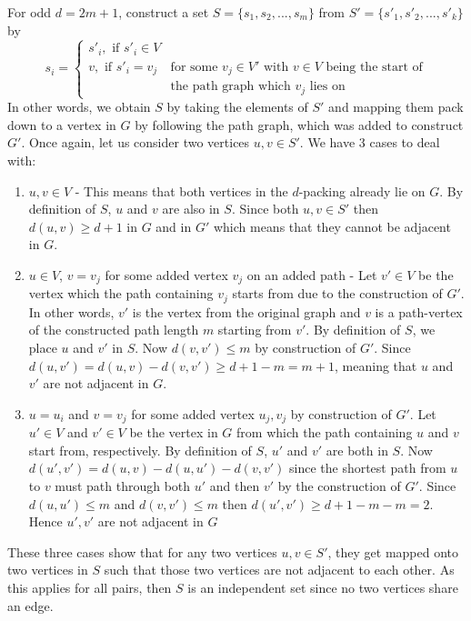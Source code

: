 \documentclass[10pt, a4paper]{article}
\theoremstyle{definition}
\newcommand{\n}{\\}
\begin{document}
For odd $d = 2m+1$, construct a set $S = \{s_1, s_2, ..., s_m\}$ from $S' = \{s'_1, s'_2, ... ,s'_k\}$ by
\[ s_i = \begin{cases}
	s'_i, \text{ if } s'_i \in V & \n
	v, \text{ if }  s'_i = v_j & \text{for some } v_j \in V' \text{ with $v \in V$ being the start of} \n & \text{the path graph which $v_j$ lies on}
\end{cases}\]
In other words, we obtain $S$ by taking the elements of $S'$ and mapping them pack down to a vertex in $G$ by following the path graph, which was added to construct $G'$. Once again, let us consider two vertices $u,v \in S'$. We have 3 cases to deal with:
\begin{enumerate}
	\item $u,v \in V$ - This means that both vertices in the $d$-packing already lie on $G$. By definition of $S$, $u$ and $v$ are also in $S$. Since both $u,v \in S'$ then $d(u,v) \geq d+1$ in $G$ and in $G'$ which means that they cannot be adjacent in $G$.
	\item $u \in V$, $v = v_j$ for some added vertex $v_j$ on an added path - Let $v' \in V$ be the vertex which the path containing $v_j$ starts from due to the construction of $G'$. In other words, $v'$ is the vertex from the original graph and $v$ is a path-vertex of the constructed path length $m$ starting from $v'$. By definition of $S$, we place $u$ and $v'$ in $S$. Now $d(v,v') \leq m$ by construction of $G'$. Since $d(u,v') = d(u,v) - d(v,v') \geq d + 1 - m = m + 1$, meaning that $u$ and $v'$ are not adjacent in $G$.
	\item $u = u_i$ and $v = v_j$ for some added vertex $u_j,v_j$ by construction of $G'$. Let $u' \in V$ and $v' \in V$ be the vertex in $G$ from which the path containing $u$ and $v$ start from, respectively. By definition of $S$, $u'$ and $v'$ are both in $S$. Now $d(u',v') = d(u,v) - d(u,u') - d(v,v')$ since the shortest path from $u$ to $v$ must path through both $u'$ and then $v'$ by the construction of $G'$. Since $d(u,u') \leq m$ and $d(v,v') \leq m$ then $d(u',v') \geq d + 1 - m - m = 2$. Hence $u', v'$ are not adjacent in $G$
\end{enumerate}
These three cases show that for any two vertices $u,v \in S'$, they get mapped onto two vertices in $S$ such that those two vertices are not adjacent to each other. As this applies for all pairs, then $S$ is an independent set since no two vertices share an edge.

\end{document}

